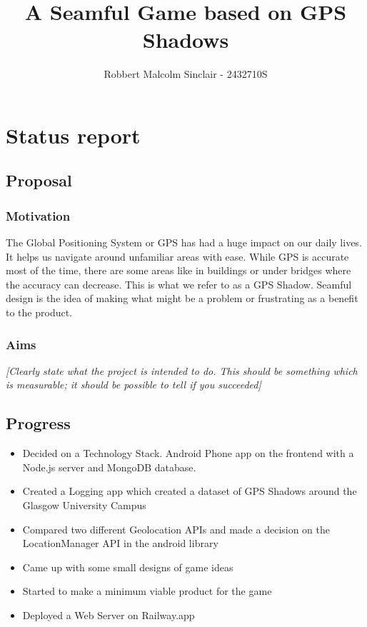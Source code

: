 \documentclass[11pt]{article}
\title{ A Seamful Game based on GPS Shadows }
\author{ Robbert Malcolm Sinclair - 2432710S }
\begin{document}
    \maketitle
    
    
     

\section{Status report}

\subsection{Proposal}\label{proposal}

\subsubsection{Motivation}\label{motivation}


The Global Positioning System or GPS has had a huge impact on our daily lives. It helps us navigate around unfamiliar areas with ease. While GPS is accurate most of the time, there
are some areas like in buildings or under bridges where the accuracy can decrease. This is what we refer to as a GPS Shadow. Seamful design is the idea of making what might be
a problem or frustrating as a benefit to the product. 


\subsubsection{Aims}\label{aims}

\emph{{[}Clearly state what the project is intended to do. This should
be something which is measurable; it should be possible to tell if you
succeeded{]}}

\subsection{Progress}\label{progress}

\begin{itemize}
    \tightlist
\item Decided on a Technology Stack. Android Phone app on the frontend with a Node.js server and MongoDB database. 
\item Created a Logging app which created a dataset of GPS Shadows around the Glasgow University Campus
\item Compared two different Geolocation APIs and made a decision on the LocationManager API in the android library
\item Came up with some small designs of game ideas
\item Started to make a minimum viable product for the game
\item Deployed a Web Server on Railway.app

\end{itemize}
\end{document}
